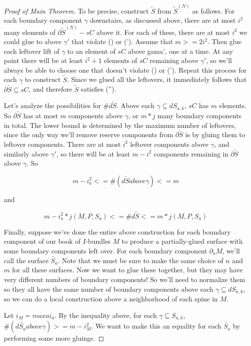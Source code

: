 \documentclass[12pt]{amsart}
\theoremstyle{definition}
\theoremstyle{remark}
\newcommand{\bd}{\partial}
\newcommand{\cin}{\subseteq}
\begin{document}
\begin{proof}[Proof of Main Theorem]
To be precise, construct $\widetilde{S}$ from $\widetilde{S}^{(N)}$ as follows.
For each boundary component $\gamma$ downstairs, as discussed above, there are
at most $i^2$ many elements of $\bd\widetilde{S}^{(N)}-sC$ above it. For each of
these, there are at most $i^2$ we could glue to above $\gamma'$ that violate
(\dag) or (\dag').  Assume that $m>=2i^2$.  Then glue each leftover lift of
$\gamma$ to an element of $sC$ above gama', one at a time. At any point there
will be at least $i^2+1$ elements of $sC$ remaining above $\gamma'$, so we'll
always be able to choose one that doesn't violate (\dag) or (\dag'). Repeat this
process for each $\gamma$ to construct $\widetilde{S}$.  Since we glued all the
leftovers, it immediately follows that $\bd\widetilde{S} \cin sC$, and therefore
$\widetilde{S}$ satisfies (\dag'').

Let's analyze the possibilities for $\#d\widetilde{S}$. Above each $\gamma \cin dS_{a,k}$,
$sC$ has $m$ elements. So $\bd\widetilde{S}$ has at most $m$ components above
$\gamma$, or $m*j$ many boundary components in total. The lower bound is
determined by the maximum number of leftovers, since the only way we'll remove
reserve components from $\bd\widetilde{S}$ is by gluing them to leftover
components. There are at most $i^2$ leftover components above $\gamma$, and
similarly above $\gamma'$, so there will be at least $m - i^2$ components
remaining in $\bd\widetilde{S}$ above $\gamma$. So

\[ m-i_a^2 <= \#(d\widetilde{S} above \gamma) <= m \]

and

\[ m-i_a^2*j(M,P,S_a) <= \#d\widetilde{S} <= m*j(M,P,S_a) \]

Finally, suppose we've done the entire above construction for each boundary
component of our book of $I$-bundles $M$ to produce a partially-glued surface
with some boundary components left over. For each boundary component $\bd_aM$,
we'll call the surface $\widetilde{S_a}$. Note that we must be sure to make the same
choice of $n$ and $m$ for all these surfaces. Now we want to glue these
together, but they may have very different numbers of boundary components! So
we'll need to normalize them so they all have the same number of boundary
components above each $\gamma \cin dS_{a,k}$, so we can do a local construction
above a neighborhood of each spine in $M$.

Let $i_M = max a i_a$. By the inequality above, for each $\gamma \cin S_{a,k}$,
$\#(d\widetilde{S_a} above \gamma) >= m - i_M^2$. We want to make this an equality for
each $\widetilde{S_a}$ by performing some more gluings.


\end{proof}
\end{document}
